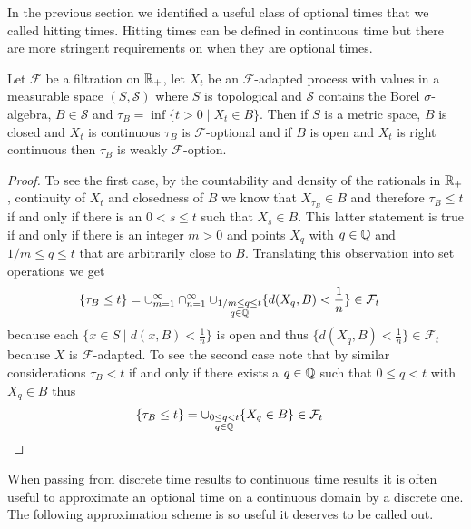 In the previous section we identified a useful class of optional times
that we called hitting times.  Hitting times can be defined in
continuous time but there are more stringent requirements on when they
are optional times.
\begin{lem}\label{HittingTimesContinuous}Let $\mathcal{F}$ be a
  filtration on $\mathbb{R}_+$, let $X_t$ be an $\mathcal{F}$-adapted
  process with values in a measurable space $(S, \mathcal{S})$ where
  $S$ is topological and $\mathcal{S}$ contains the Borel $\sigma$-algebra, 
  $B \in \mathcal{S}$ and $\tau_B = \inf \lbrace t > 0 \mid X_t \in
  B\rbrace$.  Then if $S$ is a metric space, $B$ is closed and $X_t$ is continuous
$\tau_B$ is $\mathcal{F}$-optional and if $B$ is open and $X_t$ is right continuous then $\tau_B$ is weakly $\mathcal{F}$-option.
\end{lem}
\begin{proof}
To see the first case, by the countability and density of the
rationals in $\mathbb{R}_+$, continuity of $X_t$ and closedness of $B$ we
know that $X_{\tau_B} \in B$ and therefore $\tau_B \leq t$ if and only if there is an $0 < s \leq t$
such that $X_s \in B$.  This latter statement is true if and only if there is an
integer $m>0$ and points $X_q$ with
$q \in \mathbb{Q}$ and $1/m \leq q \leq t$ that are arbitrarily close to
$B$.  Translating this observation into set operations we get
\begin{align*}
\lbrace \tau_B \leq t \rbrace &= \cup_{m=1}^\infty \cap_{n =1}^\infty \cup_{\substack{1/m
    \leq q \leq t \\ q \in \mathbb{Q}}} \lbrace d(X_q, B) < \frac{1}{n}
  \rbrace \in \mathcal{F}_t
\end{align*}
because each $\lbrace x \in S \mid d(x, B) < \frac{1}{n}  \rbrace$ is
open and thus $\lbrace d(X_q, B) < \frac{1}{n}  \rbrace \in
\mathcal{F}_t$ because $X$ is $\mathcal{F}$-adapted.
To see the second case note that by similar considerations $\tau_B < t$ if and only if there
exists a $q \in \mathbb{Q}$ such that $0 \leq q < t$ with $X_q \in B$
thus
\begin{align*}
\lbrace \tau_B \leq t \rbrace &= \cup_{\substack{0 \leq q < t \\ q \in
    \mathbb{Q}}} \lbrace X_q \in B \rbrace \in \mathcal{F}_t
\end{align*}

\end{proof}

When passing from discrete time results to continuous time results it
is often useful to approximate an optional time on a continuous domain
by a discrete one.  The following approximation scheme is so useful it
deserves to be called out.

